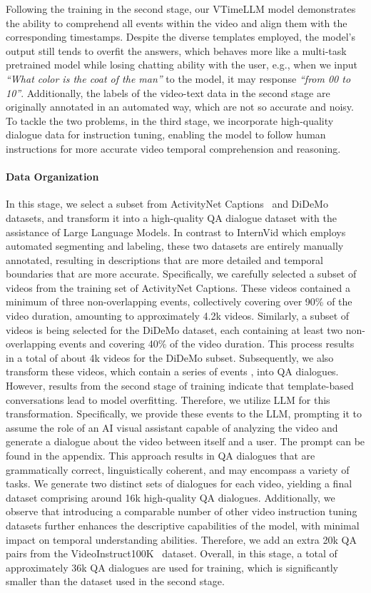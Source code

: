 \documentclass[10pt,twocolumn,letterpaper]{article}
\begin{document}
Following the training in the second stage, our VTimeLLM model demonstrates the ability to comprehend all events within the video and align them with the corresponding timestamps. Despite the diverse templates employed, the model's output still tends to overfit the answers, which behaves more like a multi-task pretrained model while losing chatting ability with the user, e.g., when we input \textit{``What color is the coat of the man''} to the model, it may response \textit{``from 00 to 10''}. Additionally, the labels of the video-text data in the second stage are originally annotated in an automated way, which are not so accurate and noisy. To tackle the two problems, in the third stage, we incorporate high-quality dialogue data for instruction tuning, enabling the model to follow human instructions for more accurate video temporal comprehension and reasoning.

\paragraph{Data Organization} In this stage, we select a subset from ActivityNet Captions~\cite{krishna2017dense_dense45} and DiDeMo~\cite{anne2017localizing_grounding10} datasets, and transform it into a high-quality QA dialogue dataset with the assistance of Large Language Models. In contrast to InternVid which employs automated segmenting and labeling, these two datasets are entirely manually annotated, resulting in descriptions that are more detailed and temporal boundaries that are more accurate. Specifically, we carefully selected a subset of videos from the training set of ActivityNet Captions. These videos contained a minimum of three non-overlapping events, collectively covering over 90\% of the video duration, amounting to approximately 4.2k videos. Similarly, a subset of videos is being selected for the DiDeMo dataset, each containing at least two non-overlapping events and covering 40\% of the video duration. This process results in a total of about 4k videos for the DiDeMo subset. Subsequently, we also transform these videos, which contain a series of events , into QA dialogues. However, results from the second stage of training indicate that template-based conversations lead to model overfitting. Therefore, we utilize LLM for this transformation. Specifically, we provide these events to the LLM, prompting it to assume the role of an AI visual assistant capable of analyzing the video and generate a dialogue about the video between itself and a user. The prompt can be found in the appendix. This approach results in QA dialogues that are grammatically correct, linguistically coherent, and may encompass a variety of tasks. We generate two distinct sets of dialogues for each video, yielding a final dataset comprising around 16k high-quality QA dialogues. Additionally, we observe that introducing a comparable number of other video instruction tuning datasets further enhances the descriptive capabilities of the model, with minimal impact on temporal understanding abilities. Therefore, we add an extra 20k QA pairs from the VideoInstruct100K~\cite{maaz2023videochatgpt} dataset. Overall, in this stage, a total of approximately 36k QA dialogues are used for training, which is significantly smaller than the dataset used in the second stage.
\end{document}
